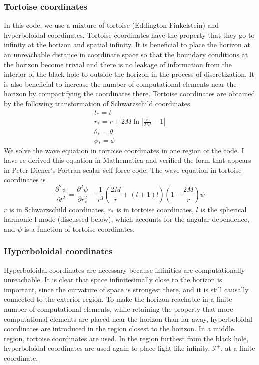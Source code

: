 \subsubsection{Tortoise coordinates}
In this code, we use a mixture of tortoise (Eddington-Finkelstein) and hyperboloidal coordinates. Tortoise coordinates have the property that they go to infinity at the horizon and spatial infinity. It is beneficial to place the horizon at an unreachable distance in coordinate space so that the boundary conditions at the horizon become trivial and there is no leakage of information from the interior of the black hole to outside the horizon in the process of discretization. It is also beneficial to increase the number of computational elements near the horizon by compactifying the coordinates there. Tortoise coordinates are obtained by the following transformation of Schwarzschild coordinates.~\cite{Wald}
\begin{eqnarray}
  t_*=t\\
  r_*=r+2M\ln|\frac{r}{2M}-1|\\
  \theta_*=\theta\\
  \phi_*=\phi
\end{eqnarray}
We solve the wave equation in tortoise coordinates in one region of the code. I have re-derived this equation in Mathematica and verified the form that appears in Peter Diener's Fortran scalar self-force code. The wave equation in tortoise coordinates is
\begin{equation}
  \frac{\partial^2\psi}{\partial t^2}=\frac{\partial^2\psi}{\partial r_*^2}-\frac{1}{r^3}\left(\frac{2M}{r}+(l+1)l\right)\left(1-\frac{2M}{r}\right)\psi
\end{equation}
$r$ is in Schwarzschild coordinates, $r_*$ is in tortoise coordinates, $l$ is the spherical harmonic l-mode (discussed below), which accounts for the angular dependence, and $\psi$ is a function of tortoise coordinates.


\subsubsection{Hyperboloidal coordinates}  
Hyperboloidal coordinates are necessary because infinities are computationally unreachable. It is clear that space infinitesimally close to the horizon is important, since the curvature of space is strongest there, and it is still causally connected to the exterior region. To make the horizon reachable in a finite number of computational elements, while retaining the property that more computational elements are placed near the horizon than far away, hyperboloidal coordinates are introduced in the region closest to the horizon. In a middle region, tortoise coordinates are used. In the region furthest from the black hole, hyperboloidal coordinates are used again to place light-like infinity, $\mathcal{I}^+$, at a finite coordinate. 



